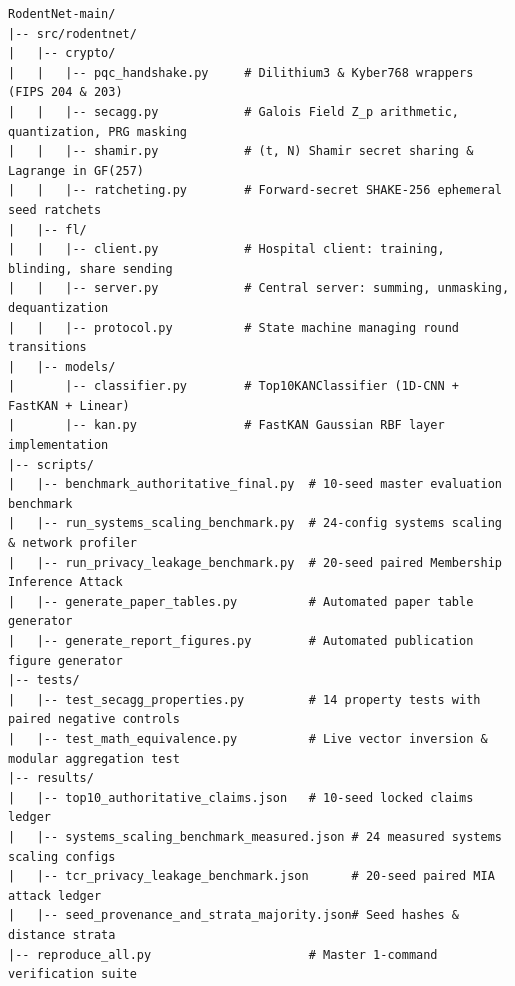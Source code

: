 \documentclass[11pt,a4paper]{report}
\begin{document}
\begin{lstlisting}[style=code]
RodentNet-main/
|-- src/rodentnet/
|   |-- crypto/
|   |   |-- pqc_handshake.py     # Dilithium3 & Kyber768 wrappers (FIPS 204 & 203)
|   |   |-- secagg.py            # Galois Field Z_p arithmetic, quantization, PRG masking
|   |   |-- shamir.py            # (t, N) Shamir secret sharing & Lagrange in GF(257)
|   |   |-- ratcheting.py        # Forward-secret SHAKE-256 ephemeral seed ratchets
|   |-- fl/
|   |   |-- client.py            # Hospital client: training, blinding, share sending
|   |   |-- server.py            # Central server: summing, unmasking, dequantization
|   |   |-- protocol.py          # State machine managing round transitions
|   |-- models/
|       |-- classifier.py        # Top10KANClassifier (1D-CNN + FastKAN + Linear)
|       |-- kan.py               # FastKAN Gaussian RBF layer implementation
|-- scripts/
|   |-- benchmark_authoritative_final.py  # 10-seed master evaluation benchmark
|   |-- run_systems_scaling_benchmark.py  # 24-config systems scaling & network profiler
|   |-- run_privacy_leakage_benchmark.py  # 20-seed paired Membership Inference Attack
|   |-- generate_paper_tables.py          # Automated paper table generator
|   |-- generate_report_figures.py        # Automated publication figure generator
|-- tests/
|   |-- test_secagg_properties.py         # 14 property tests with paired negative controls
|   |-- test_math_equivalence.py          # Live vector inversion & modular aggregation test
|-- results/
|   |-- top10_authoritative_claims.json   # 10-seed locked claims ledger
|   |-- systems_scaling_benchmark_measured.json # 24 measured systems scaling configs
|   |-- tcr_privacy_leakage_benchmark.json      # 20-seed paired MIA attack ledger
|   |-- seed_provenance_and_strata_majority.json# Seed hashes & distance strata
|-- reproduce_all.py                      # Master 1-command verification suite
\end{lstlisting}
\end{document}
